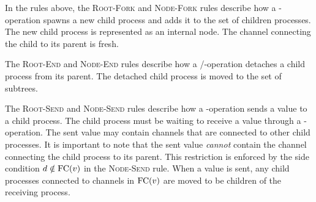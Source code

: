 In the rules above, the \textsc{Root-Fork} and \textsc{Node-Fork} rules
describe how a \Fork{}-operation spawns a new child process and adds it to the
set of children processes. The new child process is represented as an internal node.
The channel connecting the child to its parent is fresh.

The \textsc{Root-End} and \textsc{Node-End} rules describe how a \Close{}/\Wait{}-operation
detaches a child process from its parent. The detached child process is moved to the set of subtrees.

The \textsc{Root-Send} and \textsc{Node-Send} rules describe how a \Send{}-operation
sends a value to a child process. The child process must be waiting to receive a value
through a \Recv{}-operation. The sent value may contain channels that are connected to
other child processes. It is important to note that the sent value \emph{cannot} contain
the channel connecting the child process to its parent. This restriction is enforced
by the side condition $d \notin \text{FC}({v})$ in the \textsc{Node-Send} rule.
When a value is sent, any child processes connected to channels in $\text{FC}({v})$ are moved
to be children of the receiving process.